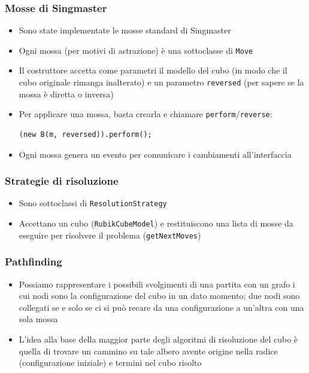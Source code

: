 \documentclass{beamer}
\begin{document}
\begin{frame}[fragile]
\frametitle{Mosse di Singmaster}
\begin{itemize}
\item Sono state implementate le mosse standard di Singmaster
\item Ogni mossa (per motivi di astrazione) è una sottoclasse di \texttt{Move}
\item Il costruttore accetta come parametri il modello del cubo (in modo che il
cubo originale rimanga inalterato) e un parametro \texttt{reversed} (per sapere
se la mossa è diretta o inversa)
\item Per applicare una mossa, basta crearla e chiamare
\texttt{perform}/\texttt{reverse}:
\begin{center}
\begin{lstlisting}
(new B(m, reversed)).perform();
\end{lstlisting}
\end{center}
\item Ogni mossa genera un evento per comunicare i cambiamenti all'interfaccia
\end{itemize}
\end{frame}

\begin{frame}
\frametitle{Strategie di risoluzione}
\begin{itemize}
\item Sono sottoclassi di \texttt{ResolutionStrategy}
\item Accettano un cubo (\texttt{RubikCubeModel}) e restituiscono una lista di
mosse da eseguire per risolvere il problema (\texttt{getNextMoves})
\end{itemize}
\end{frame}

\begin{frame}
\frametitle{Pathfinding}
\begin{itemize}
\item Possiamo rappresentare i possibili svolgimenti di una partita con un
grafo i cui nodi sono la configurazione del cubo in un dato momento; due nodi
sono collegati se e solo se ci si può recare da una configurazione a un'altra
con una sola mossa
\item L'idea alla base della maggior parte degli algoritmi di risoluzione del
cubo è quella di trovare un cammino su tale albero avente origine nella radice
(configurazione iniziale) e termini nel cubo risolto
\end{itemize}
\end{frame}
\end{document}

